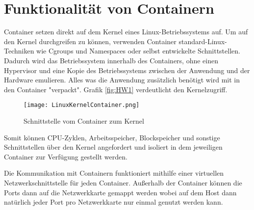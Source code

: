 \section{Funktionalität von Containern}
\label{sec:Funktionalität von Container}
Container setzen direkt auf dem Kernel eines Linux-Betriebssystems auf. Um auf den Kernel durchgreifen zu können, verwenden Container standard-Linux-Techniken wie Cgroups und Namespaces oder selbst entwickelte Schnittstellen. Dadurch wird das Betriebssystem innerhalb des Containers, ohne einen Hypervisor und eine Kopie des Betriebssystems zwischen der Anwendung und der Hardware emulieren. Alles was die Anwendung zusätzlich benötigt wird mit in den Container "verpackt".\cite{10228802020150501} Grafik \ref{fig:HW1} verdeutlicht den Kernelzugriff.
\begin{figure}[H]
	\begin{center}
		\texttt{[image: LinuxKernelContainer.png]}
	\end{center}
	\caption[Schnittstelle vom Container zum Kernel]{Schnittstelle vom Container zum Kernel \footnotemark}
	\label{fig:linuxkernelcontainer}
\end{figure}
Somit können CPU-Zyklen, Arbeitsspeicher, Blockspeicher und sonstige Schnittstellen über den Kernel angefordert und isoliert in dem jeweiligen Container zur Verfügung gestellt werden.\cite{12059254020170101}

Die Kommunikation mit Containern funktioniert mithilfe einer virtuellen Netzwerkschnittstelle für jeden Container. Außerhalb der Container können die Ports dann auf die Netzwerkkarte gemappt werden wobei auf dem Host dann natürlich jeder Port pro Netzwerkkarte nur einmal genutzt werden kann.\cite{10228802020150501}

